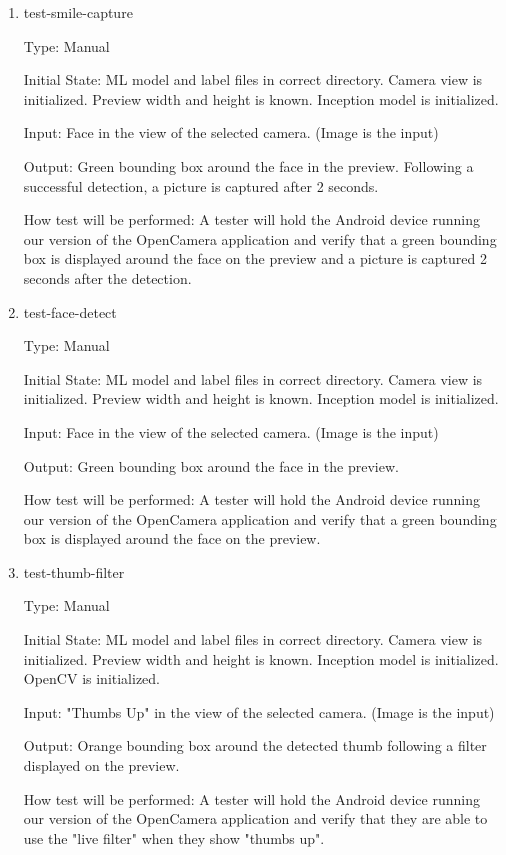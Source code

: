 \documentclass[12pt, titlepage]{article}
\begin{document}
\begin{enumerate}

\item{test-smile-capture\\}

Type: Manual
					
Initial State: 
    ML model and label files in correct directory. Camera view is initialized. Preview width and height is known. Inception model is initialized. 
					
Input: Face in the view of the selected camera. (Image is the input)
					
Output: Green bounding box around the face in the preview. Following a successful detection, a picture is captured after 2 seconds. 
					
How test will be performed: A tester will hold the Android device running our version of the OpenCamera application and verify that a green bounding box is displayed around the face on the preview and a picture is captured 2 seconds after the detection.

\item{test-face-detect\\}

Type: Manual
					
Initial State: 
    ML model and label files in correct directory. Camera view is initialized. Preview width and height is known. Inception model is initialized. 
					
Input: Face in the view of the selected camera. (Image is the input)
					
Output: Green bounding box around the face in the preview. 
					
How test will be performed: A tester will hold the Android device running our version of the OpenCamera application and verify that a green bounding box is displayed around the face on the preview.

\item{test-thumb-filter\\}

Type: Manual
					
Initial State: 
    ML model and label files in correct directory. Camera view is initialized. Preview width and height is known. Inception model is initialized. OpenCV is initialized. 
					
Input: "Thumbs Up" in the view of the selected camera. (Image is the input)
					
Output: Orange bounding box around the detected thumb following a filter displayed on the preview. 
					
How test will be performed: A tester will hold the Android device running our version of the OpenCamera application and verify that they are able to use the "live filter" when they show "thumbs up".

\end{enumerate}
\end{document}
